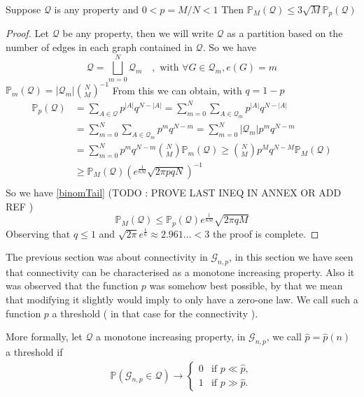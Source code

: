 \begin{theorem}\label{th:linkMP}
	Suppose $\mathcal{Q}$ is any property and $0 < p = M/N< 1$ 
	\newline
	Then $\mathbb{P}_M(\mathcal{Q}) \leq 3 \sqrt{M}\mathbb{P}_p(\mathcal{Q})$
\end{theorem}
\begin{proof}
	Let $\mathcal{Q}$ be any property, then we will write $\mathcal{Q}$ as a partition based on the number of edges in each graph contained in $\mathcal{Q}$.
	\newline
	So we have
	$$\mathcal{Q} = \bigsqcup_{m=0}^{N} \mathcal{Q}_m \quad, \text{ with } \forall G \in \mathcal{Q}_m, e(G) = m$$
	$\mathbb{P}_m(\mathcal{Q}) = |\mathcal{Q}_m| \binom{N}{M}^{-1}$
	From this we can obtain, with $q = 1 - p$
	\begin{align*}
		\mathbb{P}_p(\mathcal{Q})	&= \sum_{A \in \mathcal{Q}} p^{|A|}q^{N-|A|}
						= \sum_{m=0}^{N}\sum_{A \in \mathcal{Q}_m} p^{|A|}q^{N-|A|}\\
						&= \sum_{m=0}^{N}\sum_{A \in \mathcal{Q}_m} p^{m}q^{N-m}
						= \sum_{m=0}^{N}|\mathcal{Q}_m|p^{m}q^{N-m}\\
						&= \sum_{m=0}^N p^mq^{N-m}\binom{N}{M}\mathbb{P}_m(\mathcal{Q}) 
						\geq \binom{N}{M}p^Mq^{N-M}\mathbb{P}_M(\mathcal{Q}) \\
						&\geq \mathbb{P}_M(\mathcal{Q})(e^{\frac{1}{6M}}\sqrt{2\pi p q N})^{-1}\\
	\end{align*}
	So we have \ref{binomTail} (TODO : PROVE LAST INEQ IN ANNEX OR ADD REF )
	\begin{equation}
		\mathbb{P}_M(\mathcal{Q}) \leq  \mathbb{P}_p(\mathcal{Q})e^{\frac{1}{6M}}\sqrt{2\pi q M}
	\end{equation}
	Observing that $q \leq 1$ and $\sqrt{2\pi}e^{\frac{1}{6}} \approx 2.961... < 3$ the proof is complete.
\end{proof}
The previous section was about connectivity in $\mathcal{G}_{n,p}$, in this section we have seen that connectivity can be characterised as a monotone increasing property.
Also it was observed that the function $p$ was somehow best possible, by that we mean that modifying it slightly would imply to only have a zero-one law. 
We call such a function $p$ a threshold ( in that case for the connectivity ). 
\newline

More formally, let $\mathcal{Q}$ a monotone increasing property,  in $\mathcal{G}_{n, p}$, we call $\hat{p} = \hat{p}(n)$ a threshold if
\begin{align}
	\mathbb{P}(\mathcal{G}_{n,p} \in \mathcal{Q}) \rightarrow \left\{\begin{array}{rl}
										0 & \text{if } p \ll \hat{p},\\
										1 & \text{if } p \gg \hat{p}.
									 \end{array}
									\right.
\end{align}

